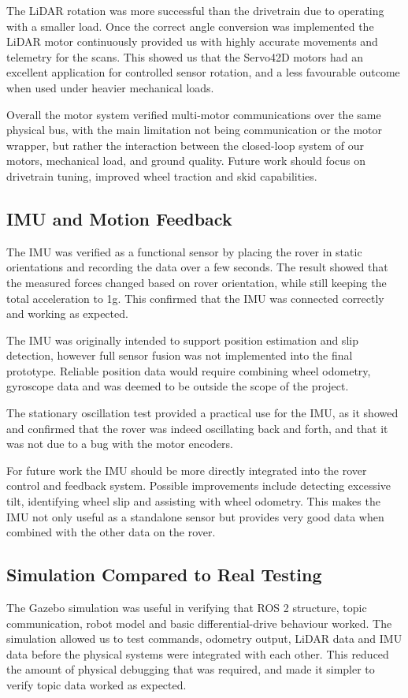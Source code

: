 The LiDAR rotation was more successful than the drivetrain due to operating with a smaller load. 
Once the correct angle conversion was implemented the LiDAR motor continuously provided us with highly accurate movements and telemetry for the scans.
This showed us that the Servo42D motors had an excellent application for controlled sensor rotation, and a less favourable outcome when used under heavier mechanical loads.

Overall the motor system verified multi-motor communications over the same physical bus, with the main limitation not being communication or the motor wrapper, 
but rather the interaction between the closed-loop system of our motors, mechanical load, and ground quality.
Future work should focus on drivetrain tuning, improved wheel traction and skid capabilities.

\subsection{IMU and Motion Feedback}
The IMU was verified as a functional sensor by placing the rover in static orientations and recording the data over a few seconds.
The result showed that the measured forces changed based on rover orientation, while still keeping the total acceleration to 1g. 
This confirmed that the IMU was connected correctly and working as expected.

The IMU was originally intended to support position estimation and slip detection, however full sensor fusion was not implemented into the final prototype.
Reliable position data would require combining wheel odometry, gyroscope data and was deemed to be outside the scope of the project.

The stationary oscillation test provided a practical use for the IMU, as it showed and confirmed that the rover was indeed oscillating back and forth, 
and that it was not due to a bug with the motor encoders.

For future work the IMU should be more directly integrated into the rover control and feedback system. Possible improvements include detecting excessive tilt, 
identifying wheel slip and assisting with wheel odometry.
This makes the IMU not only useful as a standalone sensor but provides very good data when combined with the other data on the rover.

\subsection{Simulation Compared to Real Testing}
The Gazebo simulation was useful in verifying that ROS 2 structure, topic communication, robot model and basic differential-drive behaviour worked.
The simulation allowed us to test commands, odometry output, LiDAR data and IMU data before the physical systems were integrated with each other.
This reduced the amount of physical debugging that was required, and made it simpler to verify topic data worked as expected.

